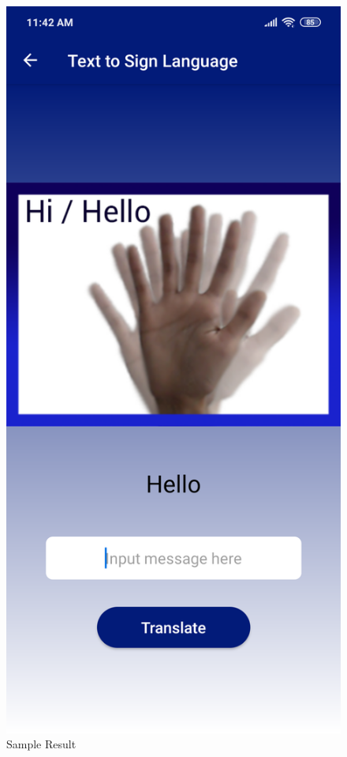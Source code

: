 \documentclass[journal]{./IEEE/IEEEtran}
\begin{document}
\begin{figure}[ht!]
    \centering
    \includegraphics[width=0.58\linewidth]{./images/screen_tts_result.png}
    \caption{Sample Result}
    \label{fig:tts_result}
\end{figure}
\end{document}
